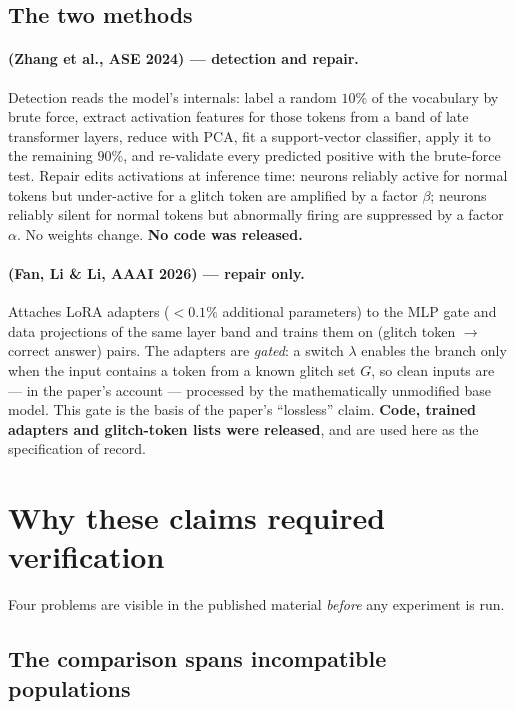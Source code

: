 \subsection{The two methods}

\paragraph{\gp{} (Zhang et al., ASE 2024) --- detection and repair.}
Detection reads the model's internals: label a random $10\%$ of the vocabulary by
brute force, extract activation features for those tokens from a band of late
transformer layers, reduce with PCA, fit a support-vector classifier, apply it to
the remaining $90\%$, and re-validate every predicted positive with the
brute-force test. Repair edits activations at inference time: neurons reliably
active for normal tokens but under-active for a glitch token are amplified by a
factor $\beta$; neurons reliably silent for normal tokens but abnormally firing
are suppressed by a factor $\alpha$. No weights change. \textbf{No code was
released.}

\paragraph{\gc{} (Fan, Li \& Li, AAAI 2026) --- repair only.}
Attaches LoRA adapters ($<0.1\%$ additional parameters) to the MLP gate and data
projections of the same layer band and trains them on (glitch token
$\rightarrow$ correct answer) pairs. The adapters are \emph{gated}: a switch
$\lambda$ enables the branch only when the input contains a token from a known
glitch set $G$, so clean inputs are --- in the paper's account --- processed by
the mathematically unmodified base model. This gate is the basis of the paper's
``lossless'' claim. \textbf{Code, trained adapters and glitch-token lists were
released}, and are used here as the specification of record.

\section{Why these claims required verification}
\label{sec:why}

Four problems are visible in the published material \emph{before} any experiment
is run.

\subsection{The comparison spans incompatible populations}

